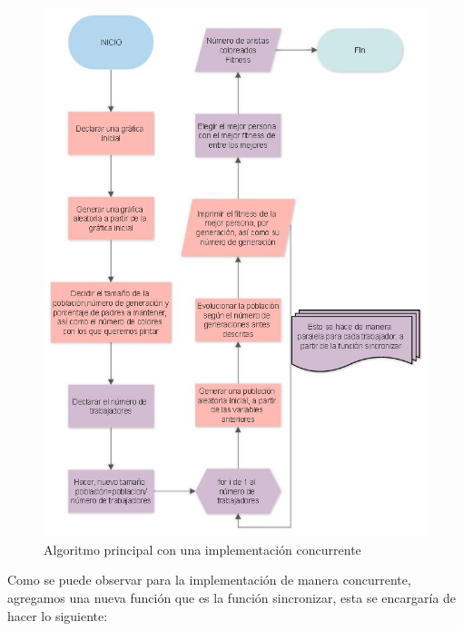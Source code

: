 \documentclass{article}
\begin{document}
\begin{figure}[H]
    \centering
    \includegraphics[width=12cm]{main_paral.jpg}
    \caption{Algoritmo principal con una implementación concurrente}
    \label{fig:my_label}
\end{figure}
Como se puede observar para la implementación de manera concurrente, agregamos una nueva función que es la función sincronizar, esta se encargaría de hacer lo siguiente:
\end{document}
